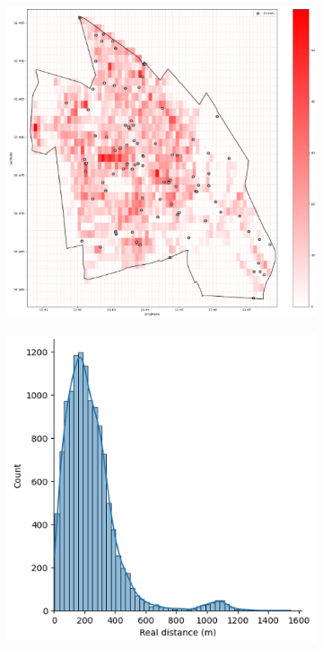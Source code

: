\begin{figure}[h]
    \centering
    \begin{subfigure}[b]{0.45\textwidth}
        \centering
        \includegraphics[width=\textwidth]{./figures/Gerard/natural.png}
        \caption{}
        \label{fig:image1}
    \end{subfigure}
    \hfill
    \begin{subfigure}[b]{0.45\textwidth}
        \centering
        \includegraphics[width=\textwidth]{./figures/Gerard/natural_1.png}
        \caption{}
        \label{fig:image2}
    \end{subfigure}
\end{figure}

